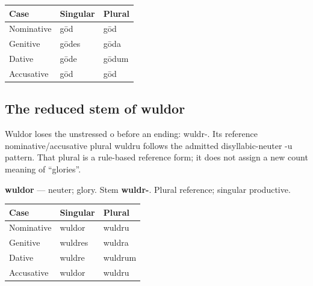 \par\begingroup
\fontsize{10.5}{13.2}\selectfont
\setlength{\LTleft}{0pt}\setlength{\LTright}{\fill}
\noindent
\begin{tabular}{@{}>{\raggedright\arraybackslash}p{39.46mm}>{\raggedright\arraybackslash}p{39.46mm}>{\raggedright\arraybackslash}p{39.46mm}@{}}
\toprule
\textbf{Case} & \textbf{Singular} & \textbf{Plural} \\
\midrule
Nominative & gōd & gōd \\
Genitive & gōdes & gōda \\
Dative & gōde & gōdum \\
Accusative & gōd & gōd \\
\bottomrule
\end{tabular}
\par\endgroup

\subsection*{The reduced stem of wuldor}

Wuldor loses the unstressed o before an ending: wuldr-. Its reference nominative/\allowbreak{}accusative plural wuldru follows the admitted disyllabic-neuter -u pattern. That plural is a rule-based reference form; it does not assign a new count meaning of “glories”.

\textbf{wuldor} — neuter; glory. Stem \textbf{wuldr-}. Plural reference; singular productive.

\par\begingroup
\fontsize{10.5}{13.2}\selectfont
\setlength{\LTleft}{0pt}\setlength{\LTright}{\fill}
\noindent
\begin{tabular}{@{}>{\raggedright\arraybackslash}p{39.46mm}>{\raggedright\arraybackslash}p{39.46mm}>{\raggedright\arraybackslash}p{39.46mm}@{}}
\toprule
\textbf{Case} & \textbf{Singular} & \textbf{Plural} \\
\midrule
Nominative & wuldor & wuldru \\
Genitive & wuldres & wuldra \\
Dative & wuldre & wuldrum \\
Accusative & wuldor & wuldru \\
\bottomrule
\end{tabular}
\par\endgroup

